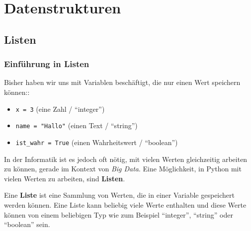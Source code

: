 \chapter{Datenstrukturen}\label{ch:K06_Datenstrukturen}
\section{Listen}
\subsection{Einführung in Listen}
Bisher haben wir uns mit Variablen beschäftigt, die nur einen Wert speichern können::
\begin{itemize}
	\item \lstinline|x = 3| (eine Zahl / \enquote{integer})
	\item \lstinline|name = "Hallo"| (einen Text /  \enquote{string})
	\item \lstinline|ist_wahr = True| (einen Wahrheitswert / \enquote{boolean})
\end{itemize}

In der Informatik ist es jedoch oft nötig, mit vielen Werten gleichzeitig arbeiten zu können, gerade im Kontext von \textit{Big Data}. Eine Möglichkeit, in Python mit vielen Werten zu arbeiten, sind \textbf{Listen}.

\begin{mydefinition}[Liste]
Eine \textbf{Liste} ist eine Sammlung von Werten, die in einer Variable gespeichert werden können. Eine Liste kann beliebig viele Werte enthalten und diese Werte können von einem beliebigen Typ wie zum Beispiel \enquote{integer}, \enquote{string} oder \enquote{boolean} sein.
\end{mydefinition}

